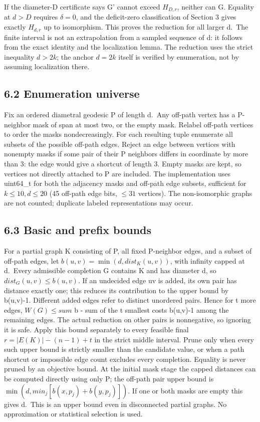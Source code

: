 \documentclass[
  11pt,
]{article}
\begin{document}
If the diameter-D certificate says G' cannot exceed \(H_{D,r}\), neither
can G. Equality at \(d>D\) requires \(\delta =0\), and the deficit-zero
classification of Section 3 gives exactly \(H_{d,r}\) up to isomorphism.
This proves the reduction for all larger d.~The finite interval is not
an extrapolation from a sampled sequence of d: it follows from the exact
identity and the localization lemma. The reduction uses the strict
inequality \(d>2k\); the anchor \(d=2k\) itself is verified by
enumeration, not by assuming localization there.

\subsection{6.2 Enumeration universe}\label{enumeration-universe}

Fix an ordered diametral geodesic P of length d.~Any off-path vertex has
a P-neighbor mask of span at most two, or the empty mask. Relabel
off-path vertices to order the masks nondecreasingly. For each resulting
tuple enumerate all subsets of the possible off-path edges. Reject an
edge between vertices with nonempty masks if some pair of their P
neighbors differs in coordinate by more than 3: the edge would give a
shortcut of length 3. Empty masks are kept, so vertices not directly
attached to P are included. The implementation uses uint64\_t for both
the adjacency masks and off-path edge subsets, sufficient for
\(k\le 10,d\le 20\) (45 off-path edge bits, \(\le 31\) vertices). The
non-isomorphic graphs are not counted; duplicate labeled representations
may occur.

\subsection{6.3 Basic and prefix bounds}\label{basic-and-prefix-bounds}

For a partial graph K consisting of P, all fixed P-neighbor edges, and a
subset of off-path edges, let
\(b(u,v)=\operatorname{min}(d,dist_{K}(u,v))\), with infinity capped at
d.~Every admissible completion G contains K and has diameter d, so
\(dist_{G}(u,v)\le b(u,v)\). If an undecided edge uv is added, its own
pair has distance exactly one; this reduces its contribution to the
upper bound by b(u,v)-1. Different added edges refer to distinct
unordered pairs. Hence for t more edges, \(W(G)\le sum\) b - sum of the
t smallest costs b(u,v)-1 among the remaining edges. The actual
reduction on other pairs is nonnegative, so ignoring it is safe. Apply
this bound separately to every feasible final \(r=|E(K)|-(n-1)+t\) in
the strict middle interval. Prune only when every such upper bound is
strictly smaller than the candidate value, or when a path shortcut or
impossible edge count excludes every completion. Equality is never
pruned by an objective bound. At the initial mask stage the capped
distances can be computed directly using only P; the off-path pair upper
bound is \(\operatorname{min}(d,min_{j}[b(x,p_{j})+b(y,p_{j})])\). If
one or both masks are empty this gives d.~This is an upper bound even in
disconnected partial graphs. No approximation or statistical selection
is used.
\end{document}
